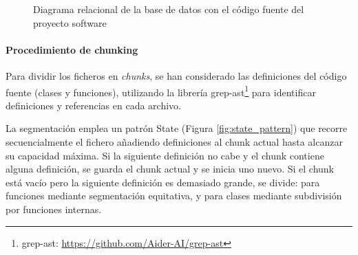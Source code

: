 \begin{figure}[h]
  \centering
  \caption{Diagrama relacional de la base de datos con el código fuente del proyecto software}
  \label{fig:relacional}
\end{figure}

\paragraph{Procedimiento de chunking}
Para dividir los ficheros en \textit{chunks}, se han considerado las definiciones del código fuente (clases y funciones), utilizando la librería grep-ast\footnote{grep-ast: \url{https://github.com/Aider-AI/grep-ast}} para identificar definiciones y referencias en cada archivo.

La segmentación emplea un patrón State (Figura \ref{fig:state_pattern}) que recorre secuencialmente el fichero añadiendo definiciones al chunk actual hasta alcanzar su capacidad máxima. Si la siguiente definición no cabe y el chunk contiene alguna definición, se guarda el chunk actual y se inicia uno nuevo. Si el chunk está vacío pero la siguiente definición es demasiado grande, se divide: para funciones mediante segmentación equitativa, y para clases mediante subdivisión por funciones internas.

